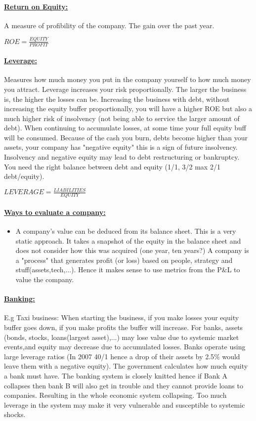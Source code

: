 \documentclass[8pt]{extreport}
\begin{document}
{\paragraph{\underline{Return on Equity:}} A measure of profibility of the company. The gain over the past year.
\begin{center}
 $ROE = \frac{EQUITY}{PROFIT}$
\end{center}
\paragraph{\underline{Leverage:}}  Measures how much money you put in the company yourself to how much money you attract. Leverage increases your risk proportionally. The larger the business is, the higher the losses can be. Increasing the business with debt, without increasing the equity buffer proportionally, you will have a higher ROE but also a much higher risk of insolvency (not being able to service the larger amount of debt). When continuing to accumulate losses, at some time your full equity buff will be consumed. Because of the cash you burn, debts become higher than your assets, your company has "negative equity" this is a sign of future insolvency. Insolvency and negative equity may lead to debt restructuring or bankruptcy. You need the right balance between debt and equity (1/1, 3/2  max 2/1 debt/equity).
 \begin{center}
$LEVERAGE=\frac{LIABILITIES}{EQUITY}$
\end{center}
\paragraph{\underline{Ways to evaluate a company:}}
\begin{itemize}
\item A company's value can be deduced from its balance sheet. This is a very static approach. It takes a snapshot of the equity in the balance sheet and does not consider how this was acquired (one year, ten years?) A company is a "process" that generates profit (or loss) based on people, strategy and stuff(assets,tech,...). Hence it makes sense to use metrics from the P$\&$L to value the company.
\end{itemize}
\paragraph{\underline{Banking:}} E.g Taxi business: When starting the business, if you make losses your equity buffer goes down, if you make profits the buffer will increase. For banks, assets (bonds, stocks, loans(largest asset),...) may lose value due to systemic market events,and equity may decrease due to accumulated losses. Banks operate using large leverage ratios (In 2007 40/1 hence a drop of their assets by 2.5$\%$ would leave them with a negative equity). The government calculates how much equity a bank must have. The banking system is closely knitted hence if Bank A collapses then bank B will also get in trouble and they cannot provide loans to companies. Resulting in the whole economic system collapsing. Too much leverage in the system may make it very vulnerable and susceptible to systemic shocks.
}
\end{document}
